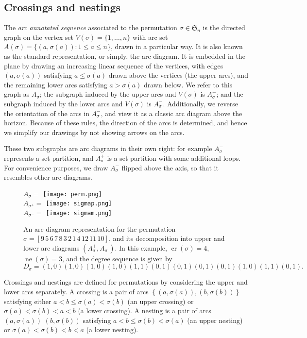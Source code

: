 \documentclass{amsart}
\begin{document}
\subsection{Crossings and nestings}
The \emph{ arc annotated sequence}  associated to the permutation $\sigma\in{\mathfrak{S}_n}$ is the directed graph on the vertex set $V(\sigma)=\{1,\dots, n\}$ with arc set $A(\sigma)=\{(a, \sigma(a)): 1\leq a\leq n\}$, drawn in a particular way. It is also known as the standard representation, or simply, the arc diagram.  It is embedded in the plane by drawing an increasing linear sequence of the vertices, with edges $(a, \sigma(a))$ satisfying  $a\leq \sigma(a)$ drawn above the vertices (the upper arcs), and the remaining lower arcs satisfying $a>\sigma(a)$ drawn below. We refer to this graph as $A_\sigma$; the subgraph induced by the upper arcs and  $V(\sigma)$ is $A_\sigma^{+}$; and the subgraph induced by the lower arcs and $V(\sigma)$ is $A_\sigma^{-}$. Additionally, we reverse the orientation of the arcs in $A_\sigma^{-}$, and view it as a classic arc diagram above the horizon.  Because of these rules, the direction of the arcs is determined, and hence we simplify our drawings by not showing arrows on the arcs.  

These two subgraphs are arc diagrams in their own right: for example $A_\sigma^{-}$ represents a set partition, and $A_\sigma^+$ is a set partition with some additional loops. For convenience purposes, we draw $A_{\sigma}^{-}$ flipped above the axis, so that it resembles other arc diagrams.

\begin{figure}\center
\large{$A_\sigma=$} \texttt{[image: perm.png]} \\ \bigskip
\large{$A_{\sigma^{+}}=$} \texttt{[image: sigmap.png]}\\ \bigskip
\large{$A_{\sigma^{-}}=$}  \texttt{[image: sigmam.png]}\\ \bigskip

\caption{An arc diagram representation for the permutation \mbox{$\sigma=[9\,5\,6\,7\,8\,3\,2\,1\,4\,12\,11\,10]$}, and its decomposition into upper and lower arc diagrams $(A_\sigma^{+}, A_\sigma^{-})$. In this example,  ${\operatorname{cr}}(\sigma)=4$, ${\operatorname{ne}}(\sigma)=3$, and the degree sequence is given by $D_{\sigma}={ (1,0)(1,0)(1,0)(1,0)(1,1)(0,1)(0,1)(0,1)(0,1)(1,0)(1,1)(0,1)}.$}
\end{figure}

Crossings and nestings are defined for permutations by considering the upper and lower arcs separately. A crossing is a pair of arcs $\left\{(a,\sigma(a)),(b, \sigma(b))\right\}$ satisfying either $a<b\leq \sigma(a)<\sigma(b)$ (an upper crossing) or $\sigma(a)<\sigma(b)<a<b$ (a lower crossing). A nesting is a pair of arcs $(a,\sigma(a))$ $(b, \sigma(b))$ satisfying $a<b\leq \sigma(b)< \sigma(a)$ (an upper nesting) or $\sigma(a)<\sigma(b)<b<a$ (a lower nesting).
\end{document}
